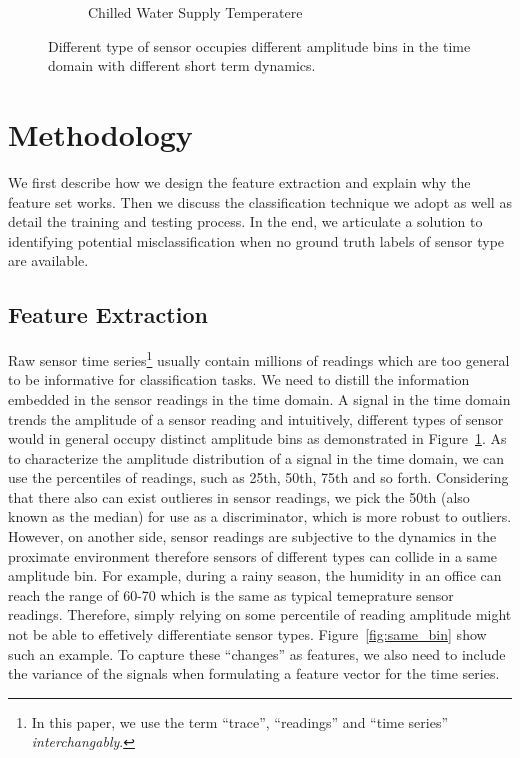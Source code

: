 \begin{figure}[ht!]
\begin{subfigure}{0.32\textwidth}
                \caption{Chilled Water Supply Temperatere}
  \end{subfigure}
\caption{Different type of sensor occupies different amplitude bins in the time domain with different short term dynamics.}
\label{fig:example}
\end{figure}

\section{Methodology}
We first describe how we design the feature extraction and explain why the feature set works. Then we discuss
the classification technique we adopt as well as detail the training and testing process. In the end, we articulate
a solution to identifying potential misclassification when no ground truth labels of sensor type are available.

\subsection{Feature Extraction}
Raw sensor time series\footnote{In this paper, we use the term ``trace'', ``readings'' and ``time series'' \textit{interchangably}.} usually contain millions of readings which are too general to be informative for classification
tasks. We need to distill the information embedded in the sensor readings in the time domain. A signal in the time domain
trends the amplitude of a sensor reading and intuitively, different types of sensor would in general occupy distinct
amplitude bins as demonstrated in Figure~\ref{fig:example}. As to characterize the amplitude distribution of a signal in the time
domain, we can use the percentiles of readings, such as 25th, 50th, 75th and so forth. Considering that there also can
exist outlieres in sensor readings, we pick the 50th (also known as the median) for use as a discriminator, which
is more robust to outliers. However, on another side, sensor readings are subjective to the dynamics in the proximate
environment therefore sensors of different types can collide in a same amplitude bin. For example, during a rainy season, the humidity in an
office can reach the range of 60-70 which is the same as typical temeprature sensor readings. Therefore, simply relying
on some percentile of reading amplitude might not be able to effetively differentiate sensor types. Figure~\ref{fig:same_bin} show such an
example. To capture these ``changes'' as features, we also need to include the variance of the signals when
formulating a feature vector for the time series.

